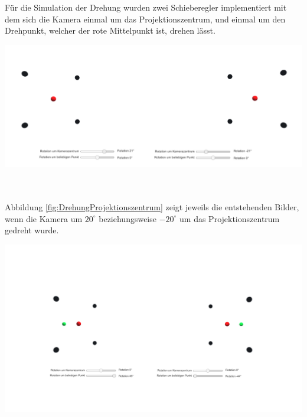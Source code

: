 Für die Simulation der Drehung wurden zwei Schieberegler implementiert mit dem sich die Kamera einmal um das Projektionszentrum, und einmal um den Drehpunkt, welcher der rote Mittelpunkt ist, drehen lässt.


\begin{minipage}{\linewidth}
	\centering
	\includegraphics[width=1.\linewidth]{images/DrehungPZ.png}
	\label{fig:DrehungProjektionszentrum}
\end{minipage}\\ \\

Abbildung \ref{fig:DrehungProjektionszentrum} zeigt jeweils die entstehenden Bilder, wenn die Kamera um \ensuremath{20^\circ} beziehungsweise \ensuremath{-20^\circ} um das Projektionszentrum gedreht wurde.

\begin{minipage}{\linewidth}
	\centering
	\includegraphics[width=1.\linewidth]{images/DrehungDZ.png}
	\label{fig:DrehungDrehpunkt}
\end{minipage}\\ 

